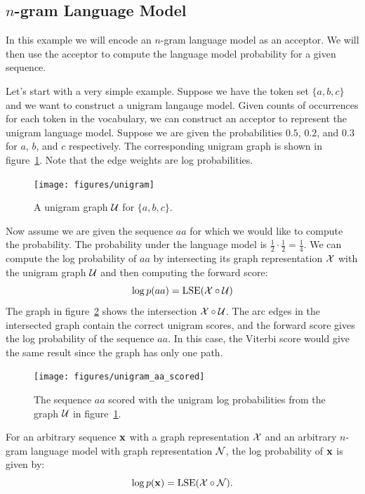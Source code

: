 \subsection{$n$-gram Language Model}
\label{sec:ngram_model}

In this example we will encode an $n$-gram language model as an acceptor. We
will then use the acceptor to compute the language model probability for a
given sequence.

Let's start with a very simple example. Suppose we have the token set $\{a, b,
c\}$ and we want to construct a unigram langauge model. Given counts of
occurrences for each token in the vocabulary, we can construct an acceptor to
represent the unigram language model. Suppose we are given the probabilities
$0.5$, $0.2$, and $0.3$ for $a$, $b$, and $c$ respectively. The corresponding
unigram graph is shown in figure~\ref{fig:unigram}. Note that the edge weights
are log probabilities.

\begin{figure}
    \centering
    \texttt{[image: figures/unigram]}
    \caption{A unigram graph $\mathcal{U}$ for $\{a, b, c\}$.}
    \label{fig:unigram}
\end{figure}

Now assume we are given the sequence $aa$ for which we would like to compute
the probability. The probability under the language model is $\frac{1}{2} \cdot
\frac{1}{2} = \frac{1}{4}$. We can compute the log probability of $aa$ by
intersecting its graph representation $\mathcal{X}$ with the unigram graph $\mathcal{U}$ and
then computing the forward score:
$$
\log p(aa) = \operatorname*{\textrm{LSE}} (\mathcal{X} \circ \mathcal{U})
$$
The graph in figure~\ref{fig:unigram_aa_scored} shows the intersection $\mathcal{X}
\circ \mathcal{U}$. The arc edges in the intersected graph contain the correct unigram
scores, and the forward score gives the log probability of the sequence $aa$.
In this case, the Viterbi score would give the same result since the graph has
only one path.

\begin{figure}
    \centering
    \texttt{[image: figures/unigram\_aa\_scored]}
    \caption{The sequence $aa$ scored with the unigram log probabilities from
    the graph $\mathcal{U}$ in figure~\ref{fig:unigram}.}
    \label{fig:unigram_aa_scored}
\end{figure}

For an arbitrary sequence ${\bf x}$ with a graph representation $\mathcal{X}$ and an
arbitrary $n$-gram language model with graph representation $\mathcal{N}$, the log
probability of ${\bf x}$ is given by:
$$
\log p({\bf x}) = \operatorname*{\textrm{LSE}}(\mathcal{X} \circ \mathcal{N}).
$$

